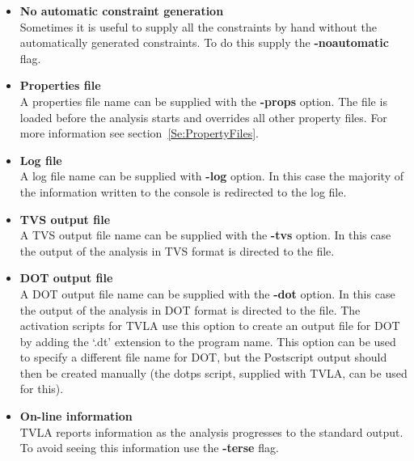 \begin{itemize}
\item{\textbf{No automatic constraint generation}}\\
Sometimes it is useful to supply all the constraints by hand
without the automatically generated constraints. To do this supply
the \textbf{-noautomatic} flag.

\item{\textbf{Properties file}}\\
A properties file name can be supplied with the \textbf{-props}
option. The file is loaded before the analysis starts and
overrides all other property files. For more information see
section~\ref{Se:PropertyFiles}.

\item{\textbf{Log file}}\\
A log file name can be supplied with \textbf{-log} option. In this
case the majority of the information written to the console is
redirected to the log file.

\item{\textbf{TVS output file}}\\
A TVS output file name can be supplied with the \textbf{-tvs}
option. In this case the output of the analysis in TVS format is
directed to the file.

\item{\textbf{DOT output file}}\\
A DOT output file name can be supplied with the \textbf{-dot}
option. In this case the output of the analysis in DOT format is
directed to the file. The activation scripts for TVLA use this
option to create an output file for DOT by adding the `.dt'
extension to the program name. This option can be used to specify
a different file name for DOT, but the Postscript output should
then be created manually (the dotps script, supplied with TVLA,
can be used for this).


\item{\textbf{On-line information}}\\
TVLA reports information as the analysis progresses to the
standard output. To avoid seeing this information use the
\textbf{-terse} flag.


\end{itemize}
